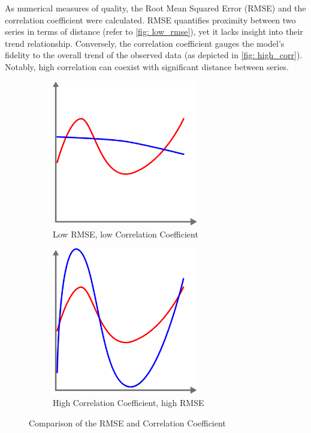 As numerical measures of quality, the Root Mean Squared Error (RMSE) and the correlation coefficient were calculated.
RMSE quantifies proximity between two series in terms of distance (refer to \autoref*{fig: low_rmse}), yet it lacks insight into their trend relationship.
Conversely, the correlation coefficient gauges the model's fidelity to the overall trend of the observed data (as depicted in \autoref*{fig: high_corr}).
Notably, high correlation can coexist with significant distance between series.

\begin{figure}
    \centering
    \begin{subfigure}{0.35\textwidth}
        \centering
        \includegraphics[width=0.7\textwidth]{resources/images/low_rmse.png}
        \caption{Low RMSE, low Correlation Coefficient}
        \label{fig: low_rmse}
    \end{subfigure}
    \hspace{0.5cm}
    \begin{subfigure}{0.35\textwidth}
        \centering
        \includegraphics[width=0.7\textwidth]{resources/images/high_corr.png}
        \caption{High Correlation Coefficient, high RMSE}
        \label{fig: high_corr}
    \end{subfigure}
    \caption{Comparison of the RMSE and Correlation Coefficient}
\end{figure}

